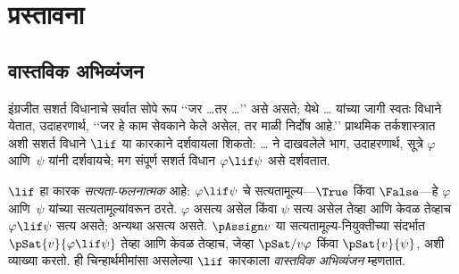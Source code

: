 \chapter{प्रस्तावना}\label{cnt:int:chap}









\section{वास्तविक अभिव्यंजन}\label{cnt:int:mat:sec}

इंग्रजीत सशर्त विधानाचे सर्वात सोपे रूप
‘‘जर \dots तर \dots’’ असे असते; येथे
\dots{} यांच्या जागी स्वतः विधाने येतात,
उदाहरणार्थ, ‘‘जर हे काम सेवकाने केले
असेल, तर माळी निर्दोष आहे.’’ प्राथमिक
तर्कशास्त्रात अशी सशर्त विधाने
$\lif$ या कारकाने दर्शवायला शिकतो:
\dots{} ने दाखवलेले भाग, उदाहरणार्थ,
सूत्रे $\varphi$ आणि~$\psi$ यांनी
दर्शवायचे; मग संपूर्ण सशर्त विधान
$\varphi \lif \psi$ असे दर्शवतात.

$\lif$ हा कारक \emph{सत्यता-फलनात्मक}
आहे: $\varphi \lif \psi$ चे सत्यतामूल्य---$\True$
किंवा $\False$---हे $\varphi$ आणि~$\psi$
यांच्या सत्यतामूल्यांवरून ठरते.
$\varphi$ असत्य असेल किंवा $\psi$ सत्य
असेल तेव्हा आणि केवळ तेव्हाच $\varphi \lif \psi$
सत्य असते; अन्यथा असत्य असते.
$\pAssign v$ या सत्यतामूल्य-नियुक्तीच्या
संदर्भात $\pSat{v}{\varphi \lif \psi}$
तेव्हा आणि केवळ तेव्हाच, जेव्हा
$\pSat/{v}{\varphi}$ किंवा
$\pSat{v}{\psi}$, अशी व्याख्या
करतो. ही चिन्हार्थमीमांसा
असलेल्या $\lif$ कारकाला
\emph{वास्तविक अभिव्यंजन}
म्हणतात.

